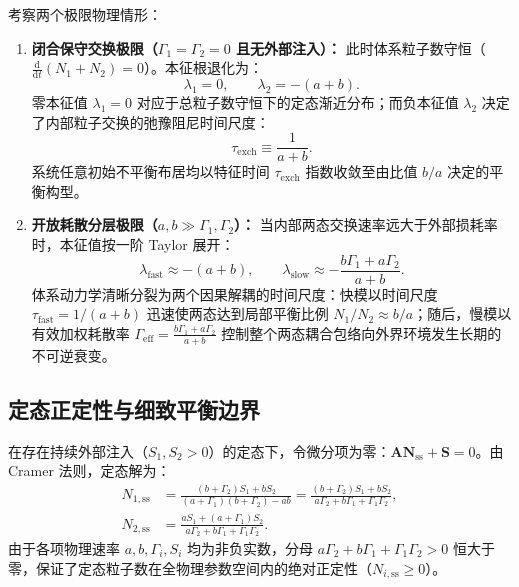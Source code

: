 考察两个极限物理情形：
\begin{enumerate}
\item \textbf{闭合保守交换极限（$\Gamma_1 = \Gamma_2 = 0$ 且无外部注入）：}
此时体系粒子数守恒（$\frac{\mathrm{d}}{\mathrm{d}t}(N_1 + N_2) = 0$）。本征根退化为：
\begin{equation}\label{eq:appD-closed-eigenvalues}
\lambda_1 = 0, \qquad \lambda_2 = -(a + b).
\end{equation}
零本征值 $\lambda_1 = 0$ 对应于总粒子数守恒下的定态渐近分布；而负本征值 $\lambda_2$ 决定了内部粒子交换的弛豫阻尼时间尺度：
\begin{equation}\label{eq:appD-texch-def}
\tau_{\mathrm{exch}} \equiv \frac{1}{a + b}.
\end{equation}
系统任意初始不平衡布居均以特征时间 $\tau_{\mathrm{exch}}$ 指数收敛至由比值 $b/a$ 决定的平衡构型。
\item \textbf{开放耗散分层极限（$a, b \gg \Gamma_1, \Gamma_2$）：}
当内部两态交换速率远大于外部损耗率时，本征值按一阶 Taylor 展开：
\begin{equation}\label{eq:appD-open-fast-slow}
\lambda_{\mathrm{fast}} \approx -(a + b), \qquad \lambda_{\mathrm{slow}} \approx -\frac{b \Gamma_1 + a \Gamma_2}{a + b}.
\end{equation}
体系动力学清晰分裂为两个因果解耦的时间尺度：快模以时间尺度 $\tau_{\mathrm{fast}} = 1/(a+b)$ 迅速使两态达到局部平衡比例 $N_1/N_2 \approx b/a$；随后，慢模以有效加权耗散率 $\Gamma_{\mathrm{eff}} = \frac{b \Gamma_1 + a \Gamma_2}{a + b}$ 控制整个两态耦合包络向外界环境发生长期的不可逆衰变。
\end{enumerate}

\subsection{定态正定性与细致平衡边界}

在存在持续外部注入（$S_1, S_2 > 0$）的定态下，令微分项为零：$\mathbf{A} \mathbf{N}_{\mathrm{ss}} + \mathbf{S} = 0$。由 Cramer 法则，定态解为：
\begin{align}
N_{1, \mathrm{ss}} &= \frac{(b + \Gamma_2) S_1 + b S_2}{(a + \Gamma_1)(b + \Gamma_2) - a b} = \frac{(b + \Gamma_2) S_1 + b S_2}{a \Gamma_2 + b \Gamma_1 + \Gamma_1 \Gamma_2}, \label{eq:appD-n1-ss} \\
N_{2, \mathrm{ss}} &= \frac{a S_1 + (a + \Gamma_1) S_2}{a \Gamma_2 + b \Gamma_1 + \Gamma_1 \Gamma_2}. \label{eq:appD-n2-ss}
\end{align}
由于各项物理速率 $a, b, \Gamma_i, S_i$ 均为非负实数，分母 $a \Gamma_2 + b \Gamma_1 + \Gamma_1 \Gamma_2 > 0$ 恒大于零，保证了定态粒子数在全物理参数空间内的绝对正定性（$N_{i, \mathrm{ss}} \ge 0$）。

